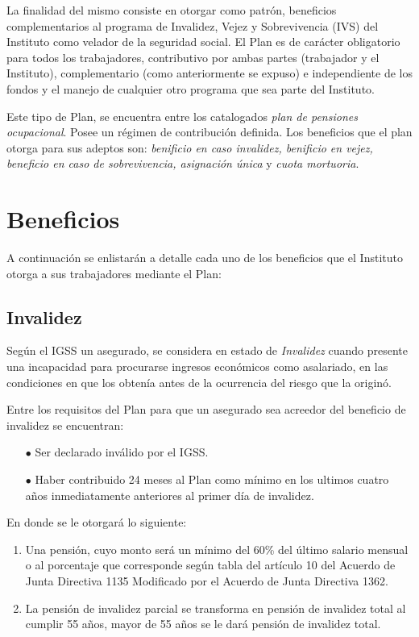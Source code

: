 \documentclass[12pt,letterpaper,titlepage]{article}
\begin{document}
La finalidad del mismo consiste en otorgar como patrón, beneficios complementarios al programa de Invalidez, Vejez y Sobrevivencia (IVS) del Instituto como velador de la seguridad social. El Plan es de carácter obligatorio para todos los trabajadores, contributivo por ambas partes (trabajador y el Instituto), complementario (como anteriormente se expuso) e independiente de los fondos y el manejo de cualquier otro programa que sea parte del Instituto.

Este tipo de Plan, se encuentra entre los catalogados \textit{plan de pensiones ocupacional}. Posee un régimen de contribución definida. Los beneficios que el plan otorga para sus adeptos son: \textit{benificio en caso invalidez, benificio en vejez, beneficio en caso de sobrevivencia, asignación única} y \textit{cuota mortuoria}.


\section{Beneficios}

A continuación se enlistarán a detalle cada uno de los beneficios que el Instituto otorga a sus trabajadores mediante el Plan:

\subsection{Invalidez}

Según el IGSS un asegurado, se considera en estado de \textit{Invalidez} cuando presente una incapacidad para procurarse ingresos económicos como asalariado, en las condiciones en que los obtenía antes de la ocurrencia del riesgo que la originó. 

Entre los requisitos del Plan para que un asegurado sea acreedor del beneficio de invalidez se encuentran:
\begin{itemize}
	\item [$\bullet$] Ser declarado inválido por el IGSS.
	\item [$\bullet$] Haber contribuido 24 meses al Plan como mínimo en los ultimos cuatro años inmediatamente anteriores al primer día de invalidez.
\end{itemize}

En donde se le otorgará lo siguiente:
\begin{enumerate}
	\item Una pensión, cuyo monto será un mínimo del 60\% del último salario mensual o al porcentaje que corresponde según tabla del artículo 10 del Acuerdo de Junta Directiva 1135 Modificado por el Acuerdo de Junta Directiva 1362.
	\item La pensión de invalidez parcial se transforma en pensión de invalidez total al cumplir 55 años, mayor de 55 años se le dará pensión de invalidez total.
\end{enumerate}
\end{document}
